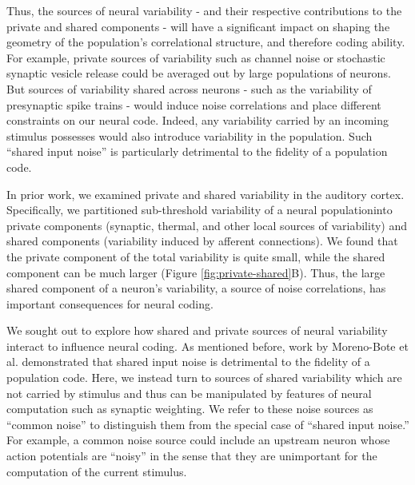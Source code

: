 \documentclass[12pt]{article}
\begin{document}
Thus, the sources of neural variability - and their respective contributions to the private and shared components - will have a significant impact on shaping the geometry of the population's correlational structure, and therefore coding ability. For example, private sources of variability such as channel noise or stochastic synaptic vesicle release could be averaged out by large populations of neurons. But sources of variability shared across neurons - such as the variability of presynaptic spike trains - would induce noise correlations and place different constraints on our neural code.  Indeed, any variability carried by an incoming stimulus possesses would also introduce variability in the population. Such ``shared input noise'' is particularly detrimental to the fidelity of a population code.

In prior work, we examined private and shared variability in the auditory cortex. Specifically, we partitioned sub-threshold variability of a neural populationinto private components (synaptic, thermal, and other local sources of variability) and shared components (variability induced by afferent connections). We found that the private component of the total variability is quite small, while the shared component can be much larger (Figure \ref{fig:private-shared}B). Thus, the large shared component of a neuron's variability, a source of noise correlations, has important consequences for neural coding.

We sought out to explore how shared and private sources of neural variability interact to influence neural coding. As mentioned before, work by Moreno-Bote et al. demonstrated that shared input noise is detrimental to the fidelity of a population code. Here, we instead turn to sources of shared variability which are not carried by stimulus and thus can be manipulated by features of neural computation such as synaptic weighting. We refer to these noise sources as ``common noise'' to distinguish them from the special case of ``shared input noise.'' For example, a common noise source could include an upstream neuron whose action potentials are ``noisy'' in the sense that they are unimportant for the computation of the current stimulus.
\end{document}
